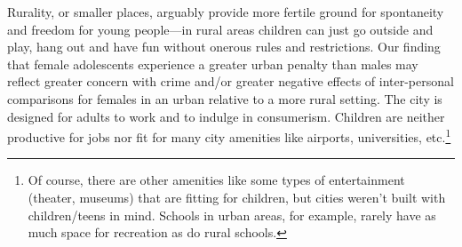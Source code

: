\documentclass[11pt, letterpaper]{article}
\begin{document}
\begin{spacing}{1.9}
Rurality, or smaller places, arguably provide more fertile ground for
spontaneity and freedom for young people---in rural areas children can just go outside
and play, hang out and have fun without onerous rules and restrictions. Our finding that female adolescents experience a greater urban penalty than males may reflect
greater concern with crime and/or greater negative effects of inter-personal comparisons for females in an urban
relative to a more rural setting. %
The city is designed for  adults to work and to indulge in consumerism. Children are
neither productive for jobs nor fit for many city amenities like airports,
universities, etc.\footnote{Of course, there are other amenities like some types
  of entertainment (theater, museums) that are fitting for children, but cities
  weren't built with children/teens in mind. Schools in urban areas, for
  example, rarely have as much space for recreation as do rural schools.} 

\end{spacing}
\end{document}
